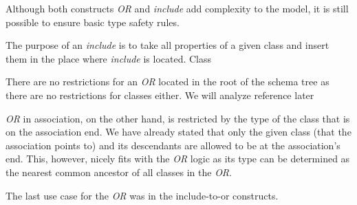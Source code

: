 
Although both constructs \textit{OR} and \textit{include} add complexity to the model, it is still possible to ensure basic type safety rules.

The purpose of an \textit{include} is to take all properties of a given class and insert them in the place where \textit{include} is located. Class


There are no restrictions for an \textit{OR} located in the root of the schema tree as there are no restrictions for classes either. We will analyze reference later

\textit{OR} in association, on the other hand, is restricted by the type of the class that is on the association end. We have already stated that only the given class (that the association points to) and its descendants are allowed to be at the association's end. This, however, nicely fits with the \textit{OR} logic as its type can be determined as the nearest common ancestor of all classes in the \textit{OR}.

The last use case for the \textit{OR} was in the include-to-or constructs.




